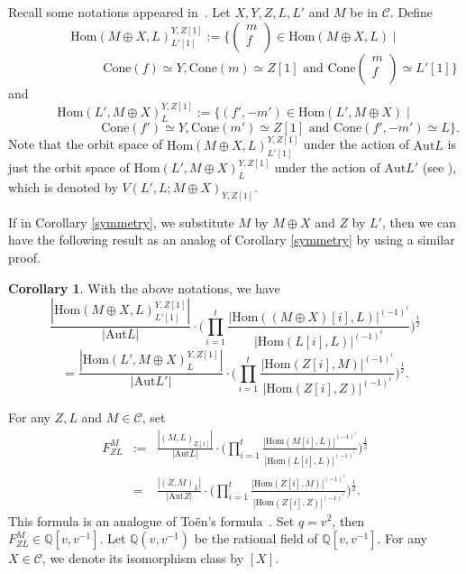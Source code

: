 \documentclass{amsart}
\theoremstyle{definition}
\newtheorem{Cor}[theorem]{Corollary}
\numberwithin{equation}{section}
\begin{document}
Recall some notations appeared in~\cite{XX2006}. Let $X,Y,Z, L, L'$
and $M$ be in ${{\mathcal{C}}}$. Define
$$
{\mathrm{Hom}}(M\oplus X,L)^{Y,Z[1]}_{L'[1]}:=\{\left(\begin{array}{c}
  m \\
  f \\
\end{array}\right)\in {\mathrm{Hom}} (M\oplus X,L)\mid$$$$\hspace{3cm}
\mathrm{Cone}(f)\simeq Y, \mathrm{Cone}(m)\simeq Z[1] \mbox{ and }\mathrm{Cone}\left(\begin{array}{c}
  m \\
  f \\
\end{array}\right)\simeq L'[1]\}
$$
and
$$
{\mathrm{Hom}}(L',M\oplus X)^{Y,Z[1]}_{L}:=\{(f',-m')\in {\mathrm{Hom}}(L',M\oplus
X)\mid
$$$$\hspace{3cm}\mathrm{Cone}(f')\simeq Y, \mathrm{Cone}(m')\simeq Z[1]
\mbox{ and } \mathrm{Cone}(f',-m')\simeq L\}.
$$
Note that the orbit space of ${\mathrm{Hom}}(M\oplus X,L)^{Y,Z[1]}_{L'[1]}$
under the action of ${\mbox{Aut}} L$ is just the orbit space of
${\mathrm{Hom}}(L',M\oplus X)^{Y,Z[1]}_{L}$  under the action of ${\mbox{Aut}} L'$
(see \cite{XX2006}), which is denoted by $V(L',L;M\oplus
X)_{Y,Z[1]}$.

If in Corollary \ref{symmetry}, we substitute $M$ by $M\oplus X$ and
 $Z$ by $L'$, then we can have the following result as an analog of
Corollary \ref{symmetry} by using a similar proof.
\begin{Cor}\label{symmetry2}
With the above notations, we have
$$\frac{|{\mathrm{Hom}}(M\oplus X,L)^{Y, Z[1]}_{L'[1]}|}{|\mathrm{Aut}L|}\cdot
\big(\prod_{i=1}^t\frac{|{\mathrm{Hom}}((M\oplus X)[i],
L)|^{(-1)^i}}{|{\mathrm{Hom}}(L[i],
L)|^{(-1)^i}}\big)^{\frac{1}{2}}$$$$=\frac{|{\mathrm{Hom}}(L',M\oplus
X)^{Y,Z[1]}_{L}|}{|\mathrm{Aut}L'|}\cdot
\big(\prod_{i=1}^t\frac{|{\mathrm{Hom}}(Z[i], M)|^{(-1)^i}}{|{\mathrm{Hom}}(Z[i],
Z)|^{(-1)^i}}\big)^{\frac{1}{2}}.$$
\end{Cor}

For any $Z, L$ and $M\in {{\mathcal{C}}}$, set
\begin{displaymath}
\begin{array}{lrl}
F_{ZL}^M
&:=&\displaystyle\frac{|(M,L)_{Z[1]}|}{|\mathrm{Aut}L|}\cdot
\big(\prod_{i=1}^t \displaystyle\frac{|{\mathrm{Hom}}(M[i],
L)|^{(-1)^i}}{|{\mathrm{Hom}}(L[i],
L)|^{(-1)^i}}\big)^{\frac{1}{2}}\\&=&\displaystyle\frac{|(Z,M)_{L}|}{|\mathrm{Aut}Z|}\cdot
\big(\prod_{i=1}^t\displaystyle\frac{|{\mathrm{Hom}}(Z[i],
M)|^{(-1)^i}}{|{\mathrm{Hom}}(Z[i], Z)|^{(-1)^i}}\big)^{\frac{1}{2}}.
\end{array}
\end{displaymath}
This formula is an analogue of To\"en's formula~\cite[Proposition
5.1]{Toen2005}. Set $q=v^2$, then $F_{ZL}^M\in {{\mathbb Q}}[v, v^{-1}].$ Let
${{\mathbb Q}}(v, v^{-1})$ be the rational field of ${{\mathbb Q}}[v, v^{-1}].$ For
any $X \in {{\mathcal{C}}}$, we denote its isomorphism class by $[X]$.
\end{document}

